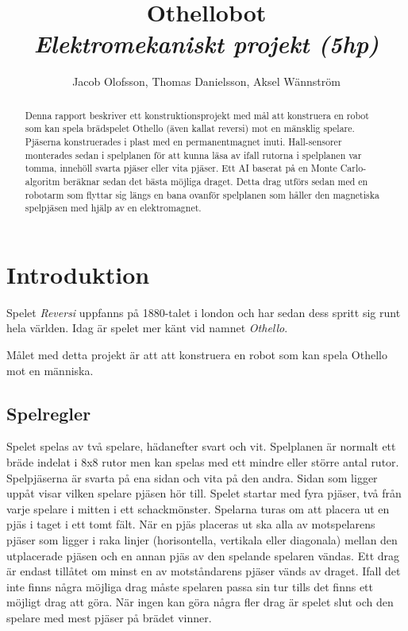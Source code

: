 \documentclass[a4paper]{article}
\begin{document}
\title{
	\textbf{Othellobot}\\
	\textit{Elektromekaniskt projekt (5hp)}
}
\author{Jacob Olofsson, Thomas Danielsson, Aksel Wännström}
\maketitle

\pagebreak

\begin{abstract}
Denna rapport beskriver ett konstruktionsprojekt med mål att konstruera en robot som kan spela brädspelet Othello (även kallat reversi) mot en mänsklig spelare.
Pjäserna konstruerades i plast med en permanentmagnet inuti.
Hall-sensorer monterades sedan i spelplanen för att kunna läsa av ifall rutorna i spelplanen var tomma, innehöll svarta pjäser eller vita pjäser.
Ett AI baserat på en Monte Carlo-algoritm beräknar sedan det bästa möjliga draget.
Detta drag utförs sedan med en robotarm som flyttar sig längs en bana ovanför spelplanen som håller den magnetiska spelpjäsen med hjälp av en elektromagnet.
\end{abstract}

\tableofcontents

\pagebreak
{}

\section{Introduktion}
Spelet \textit{Reversi} uppfanns på 1880-talet i london och har sedan dess spritt sig runt hela världen.
Idag är spelet mer känt vid namnet \textit{Othello}.

Målet med detta projekt är att att konstruera en robot som kan spela Othello mot en människa.

\subsection{Spelregler}
Spelet spelas av två spelare, hädanefter svart och vit.
Spelplanen är normalt ett bräde indelat i 8x8 rutor men kan spelas med ett mindre eller större antal rutor.
Spelpjäserna är svarta på ena sidan och vita på den andra.
Sidan som ligger uppåt visar vilken spelare pjäsen hör till.
Spelet startar med fyra pjäser, två från varje spelare i mitten i ett schackmönster.
Spelarna turas om att placera ut en pjäs i taget i ett tomt fält.
När en pjäs placeras ut ska alla av motspelarens pjäser som ligger i raka linjer (horisontella, vertikala eller diagonala) mellan den utplacerade pjäsen och en annan pjäs av den spelande spelaren vändas.
Ett drag är endast tillåtet om minst en av motståndarens pjäser vänds av draget.
Ifall det inte finns några möjliga drag måste spelaren passa sin tur tills det finns ett möjligt drag att göra.
När ingen kan göra några fler drag är spelet slut och den spelare med mest pjäser på brädet vinner.
\end{document}
